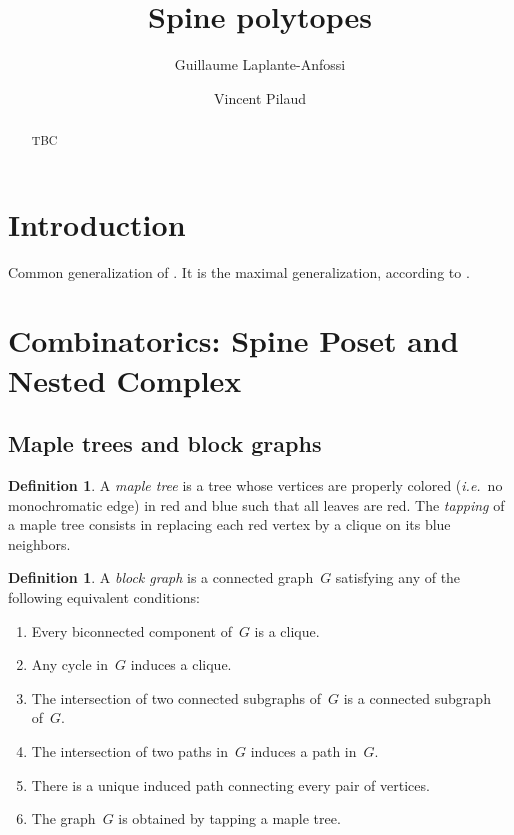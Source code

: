 \documentclass{amsart}
\title{Spine polytopes}
\author{Guillaume Laplante-Anfossi}
\author{Vincent Pilaud}
\theoremstyle{definition}
\newtheorem{definition}[theorem]{Definition}
\newcommand{\ie}{\textit{i.e.}~} %
\newcommand{\darkblue}{\color{darkblue}} %
\newcommand{\defn}[1]{\textsl{\darkblue #1}} %
\begin{document}
\begin{abstract}
TBC
\end{abstract}

\maketitle

\tableofcontents


\newpage
\section*{Introduction}

Common generalization of \cite{Pilaud-signedTreeAssociahedraFPSAC, LangePilaud, PilaudPons-permutrees, Laplante-diagonalOperahedra}.
It is the maximal generalization, according to \cite{Pilaud-removahedra}.


\newpage
\section{Combinatorics: Spine Poset and Nested Complex}


\subsection{Maple trees and block graphs}

\begin{definition}
  A \defn{maple tree} is a tree whose vertices are properly colored (\ie no monochromatic edge) in red and blue such that all leaves are red.
  The \defn{tapping} of a maple tree consists in replacing each red vertex by a clique on its blue neighbors.
\end{definition}

\begin{definition}
  \label{def:blockgraph}
  A \defn{block graph} is a connected graph~$G$ satisfying any of the following equivalent conditions:
  \begin{enumerate}
    \item Every biconnected component of~$G$ is a clique.
    \item Any cycle in~$G$ induces a clique.
    \item The intersection of two connected subgraphs of~$G$ is a connected subgraph of~$G$.
    \item The intersection of two paths in~$G$ induces a path in~$G$.
    \item There is a unique induced path connecting every pair of vertices.
    \item The graph~$G$ is obtained by tapping a maple tree.
  \end{enumerate}
\end{definition}
\end{document}
